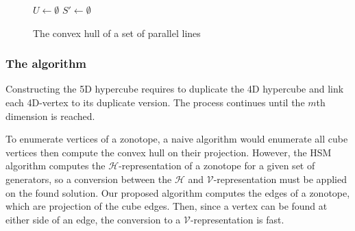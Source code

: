\begin{figure}[ht]
    \centering
    \begin{minipage}{.8\linewidth}
        \begin{algorithm}[H]
            \SetAlgoLined
            $U\gets \emptyset$\;
            $S'\gets \emptyset$\;
            \caption{The convex hull of a set of parallel lines}
            \label{alg:convexHullParallelLines}
        \end{algorithm}
    \end{minipage}
\end{figure}


\subsubsection{The algorithm}
Constructing the 5D hypercube requires to duplicate the 4D hypercube and link each 4D-vertex to its duplicate version.
The process continues until the $m$th dimension is reached.

To enumerate vertices of a zonotope, a naive algorithm would enumerate all cube vertices then compute the convex hull on 
their projection. However, the HSM algorithm computes the $\mathcal{H}$-representation of a zonotope for a given set of generators, so 
a conversion between the $\mathcal{H}$ and $\mathcal{V}$-representation must be applied on the found solution.
Our proposed algorithm computes the edges of a zonotope, which are projection of the cube edges. Then, since a vertex can be found
at either side of an edge, the conversion to a $\mathcal{V}$-representation is fast.


